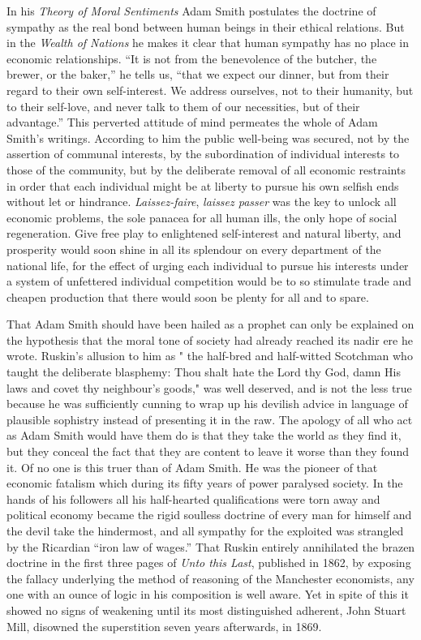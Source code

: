 \documentclass{book}
\begin{document}
In his \emph{Theory of Moral Sentiments} Adam Smith postulates the doctrine of sympathy as the real bond between human beings in their ethical relations. But in the \emph{Wealth of Nations} he makes it clear that human sympathy has no place in economic relationships. “It is not from the benevolence of the butcher, the brewer, or the baker,” he tells us, “that we expect our dinner, but from their regard to their own self-interest. We address ourselves, not to their humanity, but to their self-love, and never talk to them of our necessities, but of their advantage.” This perverted attitude of mind permeates the whole of Adam Smith’s writings. According to him the public well-being was secured, not by the assertion of communal interests, by the subordination of individual interests to those of the community, but by the deliberate removal of all economic restraints in order that each individual might be at liberty to pursue his own selfish ends without let or hindrance. \emph{Laissez-faire}, \emph{laissez passer} was the key to unlock all economic problems, the sole panacea for all human ills, the only hope of social regeneration. Give free play to enlightened self-interest and natural liberty, and prosperity would soon shine in all its splendour on every department of the national life, for the effect of urging each individual to pursue his interests under a system of unfettered individual competition would be to so stimulate trade and cheapen production that there would soon be plenty for all and to spare.

That Adam Smith should have been hailed as a prophet can only be explained on the hypothesis that the moral tone of society had already reached its nadir ere he wrote. Ruskin’s allusion to him as " the half-bred and half-witted Scotchman who taught the deliberate blasphemy: Thou shalt hate the Lord thy God, damn His laws and covet thy neighbour’s goods," was well deserved, and is not the less true because he was sufficiently cunning to wrap up his devilish advice in language of plausible sophistry instead of presenting it in the raw. The apology of all who act as Adam Smith would have them do is that they take the world as they find it, but they conceal the fact that they are content to leave it worse than they found it. Of no one is this truer than of Adam Smith. He was the pioneer of that economic fatalism which during its fifty years of power paralysed society. In the hands of his followers all his half-hearted qualifications were torn away and political economy became the rigid soulless doctrine of every man for himself and the devil take the hindermost, and all sympathy for the exploited was strangled by the Ricardian “iron law of wages.” That Ruskin entirely annihilated the brazen doctrine in the first three pages of \emph{Unto this Last}, published in 1862, by exposing the fallacy underlying the method of reasoning of the Manchester economists, any one with an ounce of logic in his composition is well aware. Yet in spite of this it showed no signs of weakening until its most distinguished adherent, John Stuart Mill, disowned the superstition seven years afterwards, in 1869.
\end{document}
